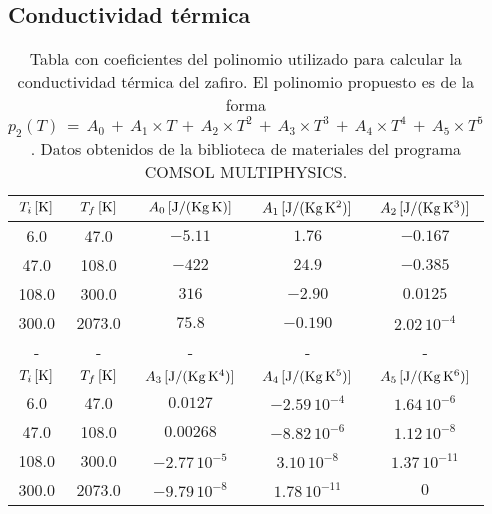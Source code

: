 \subsection*{Conductividad térmica}
\begin{table}[h!]
  \centering
  \begin{tabular}{|c|c|c|c|c|}\hline
$T_{i}\,[\rm K]$	&	$T_{f}\,[\rm K]$	&	$A_0\,[\rm J/(\rm Kg\,K)]$	&	$A_1\,[\rm J/(\rm Kg\,K^2)]$	&	$A_2\,[\rm J/(\rm Kg\,K^3)]$	\\ \hline
6.0	&	47.0	&$	-5.11	$&$	1.76	$&$	-0.167	$\\ \hline
47.0	&	108.0	&$	-422	$&$	24.9	$&$	-0.385	$ \\ \hline
108.0	&	300.0	&$	316	$&$	-2.90	$&$	0.0125	$\\ \hline
300.0	&	2073.0	&$	75.8	$&$	-0.190	$&$	2.02\,10^{-4}	$\\ \hline
-&-&-&-&-\\ \hline	
$T_{i}\,[\rm K]$	&	$T_{f}\,[\rm K]$	&	$A_3\,[\rm J/(\rm Kg\,K^4)]$	&	$A_4\,[\rm J/(\rm Kg\,K^5)]$	&	$A_5\,[\rm J/(\rm Kg\,K^6)]$ \\ \hline
6.0	&	47.0	&$	0.0127	$&$	-2.59\,10^{-4}	$&$	1.64\,10^{-6} $\\ \hline
47.0	&	108.0	&$	0.00268	$&$	-8.82\,10^{-6}	$&$	1.12\,10^{-8}	$\\ \hline
108.0	&	300.0	&$	-2.77\,10^{-5}	$&$	3.10\,10^{-8}	$&$	1.37\,10^{-11}	$\\ \hline
300.0	&	2073.0	&$	-9.79\,10^{-8}	$&$	1.78\,10^{-11}	$&$	0	$\\ \hline
  \end{tabular}
  \caption[Tabla con coeficientes del polinomio utilizado para calcular la conductividad térmica del zafiro.]{Tabla con coeficientes del polinomio utilizado para calcular la conductividad térmica del zafiro. El polinomio propuesto es de la forma $p_2(T) \,=\, A_0\,+\,A_1 \times T\,+\,A_2 \times T^2\,+\,A_3 \times T^3\,+\,A_4 \times T^4\,+\,A_5 \times T^5$. Datos obtenidos de la biblioteca de materiales del programa COMSOL MULTIPHYSICS.}
  \label{tab:kzaf}
\end{table}
